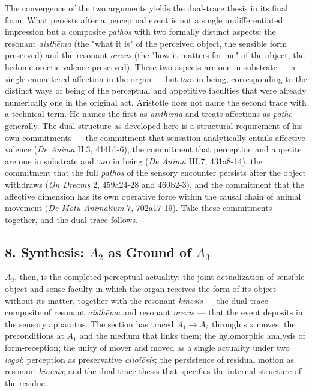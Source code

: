 \documentclass[12pt]{article}
\begin{document}
The convergence of the two arguments yields the dual-trace thesis in its final form. What persists after a perceptual event is not a single undifferentiated impression but a composite \textit{pathos} with two formally distinct aspects: the resonant \textit{aisthēma} (the "what it is" of the perceived object, the sensible form preserved) and the resonant \textit{orexis} (the "how it matters for me" of the object, the hedonic-orectic valence preserved). These two aspects are one in substrate --- a single enmattered affection in the organ --- but two in being, corresponding to the distinct ways of being of the perceptual and appetitive faculties that were already numerically one in the original act. Aristotle does not name the second trace with a technical term. He names the first as \textit{aisthēma} and treats affections as \textit{pathē} generally. The dual structure as developed here is a structural requirement of his own commitments --- the commitment that sensation analytically entails affective valence (\textit{De Anima} II.3, 414b1-6), the commitment that perception and appetite are one in substrate and two in being (\textit{De Anima} III.7, 431a8-14), the commitment that the full \textit{pathos} of the sensory encounter persists after the object withdraws (\textit{On Dreams} 2, 459a24-28 and 460b2-3), and the commitment that the affective dimension has its own operative force within the causal chain of animal movement (\textit{De Motu Animalium} 7, 702a17-19). Take these commitments together, and the dual trace follows.

\subsection*{8. Synthesis: $A_2$ as Ground of $A_3$}

$A_2$, then, is the completed perceptual actuality: the joint actualization of sensible object and sense faculty in which the organ receives the form of its object without its matter, together with the resonant \textit{kinēsis} --- the dual-trace composite of resonant \textit{aisthēma} and resonant \textit{orexis} --- that the event deposits in the sensory apparatus. The section has traced $A_1$$\to$$A_2$ through six moves: the preconditions at $A_1$ and the medium that links them; the hylomorphic analysis of form-reception; the unity of mover and moved as a single actuality under two \textit{logoi}; perception as preservative \textit{alloiōsis}; the persistence of residual motion as resonant \textit{kinēsis}; and the dual-trace thesis that specifies the internal structure of the residue.
\end{document}
